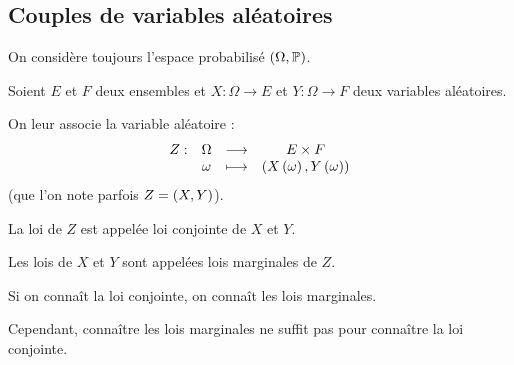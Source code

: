 \subsection{Couples de variables aléatoires}

On considère toujours l'espace probabilisé \(\groupe{\Omega}[\prem]\).

Soient \(E\) et \(F\) deux ensembles et \(X:\Omega\to E\) et \(Y:\Omega\to F\) deux variables aléatoires.

On leur associe la variable aléatoire : \[\begin{array}[t]{cccc}Z : & \Omega & \longrightarrow & E\times F \\ & \omega & \longmapsto & \left(X\left(\omega\right),Y\left(\omega\right)\right)\end{array}\] (que l'on note parfois \(Z=\left(X,Y\right)\)).

\begin{defi}
La loi de \(Z\) est appelée loi conjointe de \(X\) et \(Y\).

Les lois de \(X\) et \(Y\) sont appelées lois marginales de \(Z\).
\end{defi}

\begin{rem}
Si on connaît la loi conjointe, on connaît les lois marginales.

Cependant, connaître les lois marginales ne suffit pas pour connaître la loi conjointe.
\end{rem}

